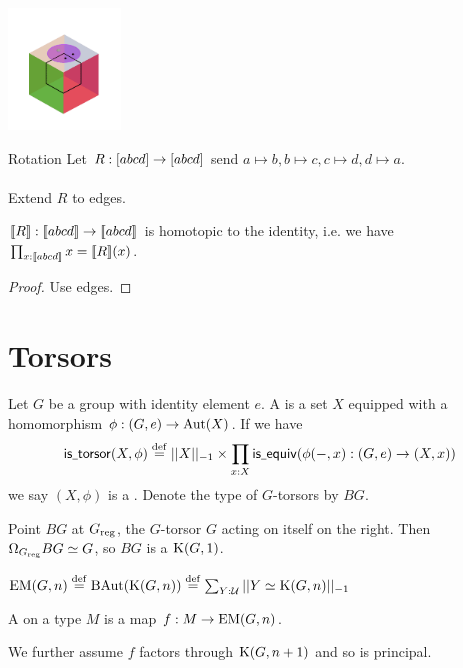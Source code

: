 \documentclass[14pt,aspectratio=169]{beamer}
\begin{document}
\begin{frame}
  \includegraphics[width=30mm]{figs/curved_cube/curved_cube-90}
\end{frame}


\begin{frame}{Rotation}
Let \( R:[{abcd}]\to[{abcd}] \) send \( a\mapsto b , b\mapsto c , c\mapsto d, d\mapsto a \). \\~\\

Extend \( R \) to edges.

\begin{lemma}
\( [\![{R}]\!]:[\![{abcd}]\!]\to[\![{abcd}]\!] \) is homotopic to the identity, i.e. we have \( \prod_{x:[\![{abcd}]\!]}x=[\![{R}]\!](x) \).
\end{lemma}
\begin{proof}
Use edges.
\end{proof}
\end{frame}

\section{Torsors}

\begin{frame}
\begin{definition}
Let \( G \) be a group with identity element \( e \). A  is a set \( X \) equipped with a homomorphism \( \phi:(G,e)\to\operatorname{Aut}(X) \). If we have
\[ 
\mathsf{is\underscore torsor}(X,\phi)\defeq ||X||_{-1}\times \pit{x:X}\mathsf{is\underscore equiv}(\phi(-,x):(G,e)\to (X,x))
\] we say \( (X,\phi) \) is a . Denote the type of \( G \)-torsors by \( BG \).
\end{definition}
\begin{lemma}
Point \( BG \) at \( {G}_\mathrm{reg} \), the \( G \)-torsor \( G \) acting on itself on the right. Then \( \Omega_{{G}_\mathrm{reg}} BG \simeq G \), so \( BG \) is a \( \mathrm{K}(G,1) \).
\end{lemma}
\end{frame}

\begin{frame}
\begin{definition}
\( \mathrm{EM}(G,n)\stackrel{\mathrm{def}}{=} \operatorname{BAut}(\mathrm{K}(G,n))\stackrel{\mathrm{def}}{=} \sum_{Y:\mathcal{U}}||Y\simeq \mathrm{K}(G,n)||_{-1} \)
\end{definition}
\begin{definition}
A  on a type \( M \) is a map \( f:M\to \mathrm{EM}(G,n) \).
\end{definition}
We further assume \( f \) factors through \( \mathrm{K}(G,n+1) \) and so is principal.
\end{frame}
\end{document}
